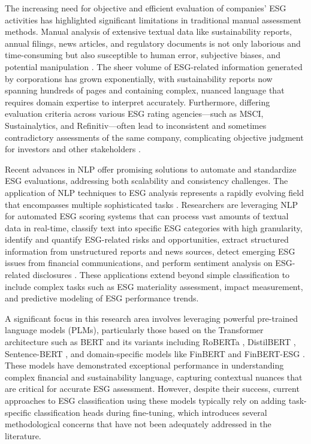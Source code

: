 \documentclass[12pt, letterpaper]{template}
\begin{document}
The increasing need for objective and efficient evaluation of companies' ESG activities has highlighted significant limitations in traditional manual assessment methods. Manual analysis of extensive textual data like sustainability reports, annual filings, news articles, and regulatory documents is not only laborious and time-consuming but also susceptible to human error, subjective biases, and potential manipulation \citep{Luccioni2020}. The sheer volume of ESG-related information generated by corporations has grown exponentially, with sustainability reports now spanning hundreds of pages and containing complex, nuanced language that requires domain expertise to interpret accurately. Furthermore, differing evaluation criteria across various ESG rating agencies—such as MSCI, Sustainalytics, and Refinitiv—often lead to inconsistent and sometimes contradictory assessments of the same company, complicating objective judgment for investors and other stakeholders \citep{Billio2020,Lee2023}.

Recent advances in NLP offer promising solutions to automate and standardize ESG evaluations, addressing both scalability and consistency challenges. The application of NLP techniques to ESG analysis represents a rapidly evolving field that encompasses multiple sophisticated tasks \citep{Avramov2022}. Researchers are leveraging NLP for automated ESG scoring systems that can process vast amounts of textual data in real-time, classify text into specific ESG categories with high granularity, identify and quantify ESG-related risks and opportunities, extract structured information from unstructured reports and news sources, detect emerging ESG issues from financial communications, and perform sentiment analysis on ESG-related disclosures \citep{sec-bert}. These applications extend beyond simple classification to include complex tasks such as ESG materiality assessment, impact measurement, and predictive modeling of ESG performance trends.

A significant focus in this research area involves leveraging powerful pre-trained language models (PLMs), particularly those based on the Transformer architecture such as BERT \citep{bert} and its variants including RoBERTa \citep{roberta}, DistilBERT \citep{distilbert}, Sentence-BERT \citep{sentence-bert}, and domain-specific models like FinBERT and FinBERT-ESG \citep{finbert}. These models have demonstrated exceptional performance in understanding complex financial and sustainability language, capturing contextual nuances that are critical for accurate ESG assessment. However, despite their success, current approaches to ESG classification using these models typically rely on adding task-specific classification heads during fine-tuning, which introduces several methodological concerns that have not been adequately addressed in the literature.
\end{document}
